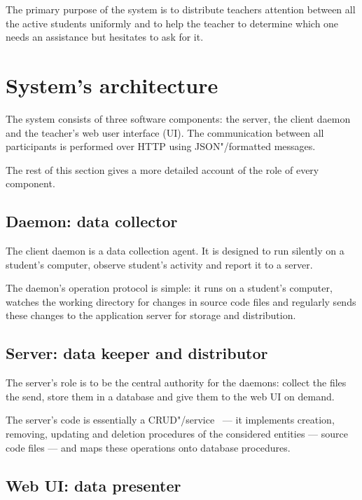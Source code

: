 The primary purpose of the system is to distribute teachers attention between
all the active students uniformly and to help the teacher to determine which one
needs an assistance but hesitates to ask for it.

\section{System's architecture}



The system consists of three software components: the server, the client daemon and the
teacher's web user interface (UI). The communication between all participants is performed
over HTTP using JSON"/formatted messages.

The rest of this section gives a more detailed account of the role of every component.

\subsection{Daemon: data collector}

The client daemon is a data collection agent. It is designed to run silently on
a student's computer, observe student's activity and report it to a server.

The daemon's operation protocol is simple: it runs on a student's computer,
watches the working directory for changes in source code files and regularly sends
these changes to the application server for storage and distribution.

\subsection{Server: data keeper and distributor}

The server's role is to be the central authority for the daemons: collect the files
the send, store them in a database and give them to the web UI on demand.

The server's code is essentially a CRUD"/service~\cite{Martin:1983:MDB:538746} ---
it implements creation, removing, updating and deletion procedures of the considered
entities --- source code files  --- and maps these operations onto database procedures.

\subsection{Web UI: data presenter}

